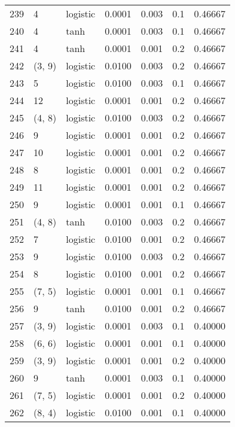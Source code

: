 \begin{tabular}{lllrrrr}
239 &           4 &  logistic &  0.0001 &  0.003 &  0.1 &   0.46667 \\
240 &           4 &      tanh &  0.0001 &  0.003 &  0.1 &   0.46667 \\
241 &           4 &      tanh &  0.0001 &  0.001 &  0.2 &   0.46667 \\
242 &      (3, 9) &  logistic &  0.0100 &  0.003 &  0.2 &   0.46667 \\
243 &           5 &  logistic &  0.0100 &  0.003 &  0.1 &   0.46667 \\
244 &          12 &  logistic &  0.0001 &  0.001 &  0.2 &   0.46667 \\
245 &      (4, 8) &  logistic &  0.0100 &  0.003 &  0.2 &   0.46667 \\
246 &           9 &  logistic &  0.0001 &  0.001 &  0.2 &   0.46667 \\
247 &          10 &  logistic &  0.0001 &  0.001 &  0.2 &   0.46667 \\
248 &           8 &  logistic &  0.0001 &  0.001 &  0.2 &   0.46667 \\
249 &          11 &  logistic &  0.0001 &  0.001 &  0.2 &   0.46667 \\
250 &           9 &  logistic &  0.0001 &  0.001 &  0.1 &   0.46667 \\
251 &      (4, 8) &      tanh &  0.0100 &  0.003 &  0.2 &   0.46667 \\
252 &           7 &  logistic &  0.0100 &  0.001 &  0.2 &   0.46667 \\
253 &           9 &  logistic &  0.0100 &  0.003 &  0.2 &   0.46667 \\
254 &           8 &  logistic &  0.0100 &  0.001 &  0.2 &   0.46667 \\
255 &      (7, 5) &  logistic &  0.0001 &  0.001 &  0.1 &   0.46667 \\
256 &           9 &      tanh &  0.0100 &  0.001 &  0.2 &   0.46667 \\
257 &      (3, 9) &  logistic &  0.0001 &  0.003 &  0.1 &   0.40000 \\
258 &      (6, 6) &  logistic &  0.0001 &  0.001 &  0.1 &   0.40000 \\
259 &      (3, 9) &  logistic &  0.0001 &  0.001 &  0.2 &   0.40000 \\
260 &           9 &      tanh &  0.0001 &  0.003 &  0.1 &   0.40000 \\
261 &      (7, 5) &  logistic &  0.0001 &  0.001 &  0.2 &   0.40000 \\
262 &      (8, 4) &  logistic &  0.0100 &  0.001 &  0.1 &   0.40000 \\

\end{tabular}
